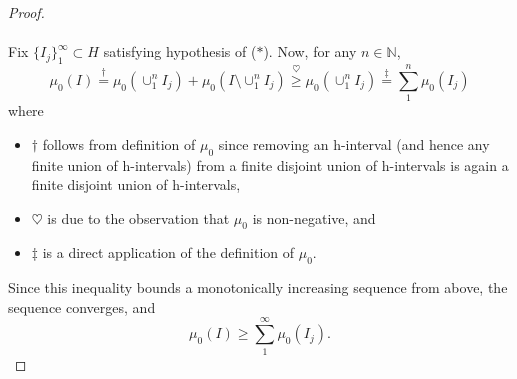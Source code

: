 \begin{proof}
  \paragraph{}
  Fix $\{I_j\}_1^\infty \subset H$ satisfying hypothesis of ($*$).
  Now, for any $n\in\mathbb N$,
  \[
  \mu_0(I) \stackrel{\dag}{=}
  \mu_0(\cup_1^n I_j) + \mu_0(I\setminus\cup_1^n I_j)
  \stackrel{\heartsuit}{\geq} \mu_0(\cup_1^n I_j)
  \stackrel{\ddag}{=} \sum_1^n \mu_0(I_j)
  \]
  where
  \begin{itemize}
  \item
    $\dag$ follows from definition of $\mu_0$ since
    removing an h-interval (and hence any finite union of h-intervals)
    from a finite disjoint union of h-intervals is again
    a finite disjoint union of h-intervals,
  \item
    $\heartsuit$ is due to the observation that $\mu_0$
    is non-negative, and
  \item
    $\ddag$ is a direct application of the definition of $\mu_0$.
  \end{itemize}
  Since this inequality bounds a monotonically increasing sequence
  from above, the sequence converges, and
  \[ \mu_0(I)\geq \sum_1^\infty \mu_0(I_j). \]

\end{proof}
